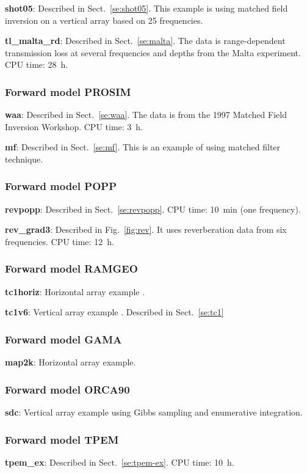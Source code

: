 \documentclass{saclantc}
\begin{document}
{\bf shot05}: Described in Sect.~\ref{se:shot05}. 
 This example is using matched field inversion on
a vertical array based on 25 frequencies.

\noindent
{\bf tl\_malta\_rd}: Described in Sect.\ \ref{se:malta}. 
The data is range-dependent transmission loss at several frequencies and depths from the
Malta experiment. CPU time: 28~h.


\subsubsection{Forward model PROSIM}
\noindent
{\bf waa}: Described in Sect.~\ref{se:waa}. The data is from the 1997 
Matched Field Inversion Workshop. CPU time: 3~h.

\noindent
{\bf mf}: Described in Sect.~\ref{se:mf}. This is an example of using
matched filter technique. 

\subsubsection{Forward model POPP}
\noindent
{\bf revpopp}: Described in Sect.~\ref{se:revpopp}. CPU time: 10~min (one frequency).

\noindent
{\bf rev\_grad3}: Described in Fig.\ \ref{fig:rev}. It uses
reverberation data from six frequencies. CPU time: 12~h.

\subsubsection{Forward model RAMGEO}
\noindent
{\bf tc1horiz}: Horizontal array example \cite{gerstoft03ph}.

\noindent
{\bf tc1v6}: Vertical array example \cite{gerstoft03ph}. Described in Sect.~\ref{se:tc1}

\subsubsection{Forward model GAMA}
\noindent
{\bf map2k}: Horizontal array example.

\subsubsection{Forward model ORCA90}
\noindent
{\bf sdc}: Vertical array example using Gibbs sampling and enumerative
integration.

\subsubsection{Forward model TPEM}
\noindent
{\bf tpem\_ex}: Described in Sect.~\ref{se:tpem-ex}. CPU time: 10~h.
\end{document}
